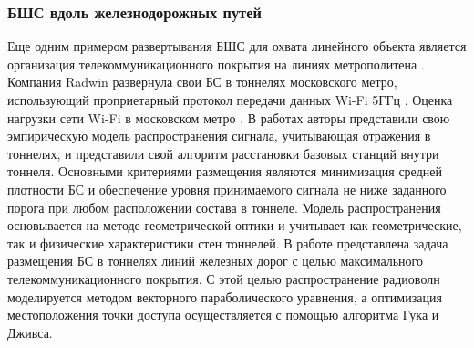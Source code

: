 







\subsubsection{БШС вдоль железнодорожных путей}

Еще одним примером развертывания БШС для охвата линейного объекта является организация телекоммуникационного покрытия на линиях метрополитена \cite{Alekseev2021, radwin_moscow_metro, Soykin2020,aderkina2020, aderkina2021}. Компания Radwin развернула свои БС в тоннелях московского метро, использующий проприетарный протокол передачи данных Wi-Fi 5ГГц \cite{radwin_moscow_metro, Soykin2020}. Оценка нагрузки сети Wi-Fi в московском метро \cite{Alekseev2021}. В работах \cite{aderkina2021, aderkina2020} авторы представили свою эмпирическую модель распространения сигнала, учитывающая отражения в тоннелях, и представили свой алгоритм расстановки базовых станций внутри тоннеля. Основными критериями размещения являются минимизация средней плотности БС и обеспечение уровня принимаемого сигнала не ниже заданного порога при любом расположении состава в тоннеле. Модель распространения основывается на методе геометрической оптики и учитывает как геометрические, так и физические характеристики стен тоннелей.  
В работе \cite{Zhang2018} представлена задача размещения БС в тоннелях линий железных дорог с целью максимального телекоммуникационного покрытия. С этой целью распространение радиоволн моделируется методом векторного параболического уравнения, а оптимизация местоположения точки доступа осуществляется с помощью алгоритма Гука и Дживса.









